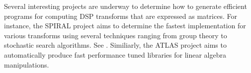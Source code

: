 Several interesting projects are underway to determine how to generate efficient programs
for computing DSP transforms that are expressed as matrices. For instance, the SPIRAL
project\cite{spiral} aims to determine the fastest implementation for various transforms
using several techniques ranging from group theory to stochastic search algorithms. See
 \cite{xiong-thesis,xiong01spl,johnson01searching,egner01automatic}.
Similiarly, the ATLAS project \cite{whaley01automated} aims to automatically produce fast
performance tuned libraries for linear algebra manipulations.
